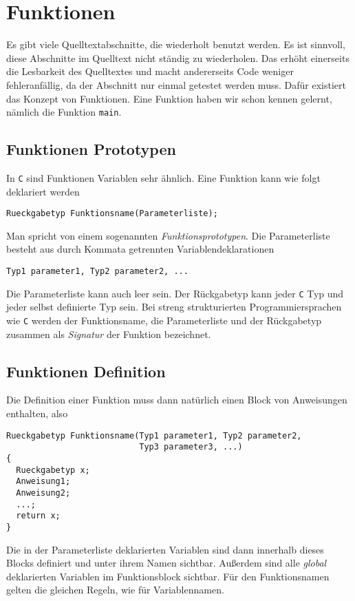 \section{Funktionen}

Es gibt viele Quelltextabschnitte, die wiederholt benutzt werden.
Es ist sinnvoll, diese Abschnitte im Quelltext nicht ständig zu wiederholen.
Das erhöht einerseits die Lesbarkeit des Quelltextes und macht andererseits Code weniger fehleranfällig, da der Abschnitt nur einmal getestet werden muss.
Dafür existiert das Konzept von Funktionen.
Eine Funktion haben wir schon kennen gelernt, nämlich die Funktion \verb|main|. 

\subsection{Funktionen Prototypen}

In \texttt{C} sind Funktionen Variablen sehr ähnlich.
Eine Funktion kann wie folgt deklariert werden
\begin{lstlisting}
Rueckgabetyp Funktionsname(Parameterliste);
\end{lstlisting}
Man spricht von einem sogenannten \emph{Funktionsprototypen}.
Die Parameterliste besteht aus durch Kommata getrennten Variablendeklarationen
\begin{lstlisting}
Typ1 parameter1, Typ2 parameter2, ...
\end{lstlisting}
Die Parameterliste kann auch leer sein.
Der Rückgabetyp kann jeder \texttt{C} Typ und jeder selbst definierte Typ sein.
Bei streng strukturierten Programmiersprachen wie \texttt{C} werden der Funktionsname, die Parameterliste und der Rückgabetyp zusammen als \emph{Signatur} der Funktion bezeichnet.

\subsection{Funktionen Definition}

Die Definition einer Funktion muss dann natürlich einen Block von Anweisungen enthalten, also

\begin{minipage}{\linewidth}
\begin{lstlisting}[caption={Funktionen Prototyp}, belowcaptionskip=0.3em]
Rueckgabetyp Funktionsname(Typ1 parameter1, Typ2 parameter2,
                           Typ3 parameter3, ...)
{
  Rueckgabetyp x;
  Anweisung1;
  Anweisung2;
  ...;
  return x;
}
\end{lstlisting}
\end{minipage}
Die in der Parameterliste deklarierten Variablen sind dann innerhalb dieses Blocks definiert und unter ihrem Namen sichtbar.
Außerdem sind alle \emph{global} deklarierten Variablen im Funktionsblock sichtbar.
Für den Funktionsnamen gelten die gleichen Regeln, wie für Variablennamen.

